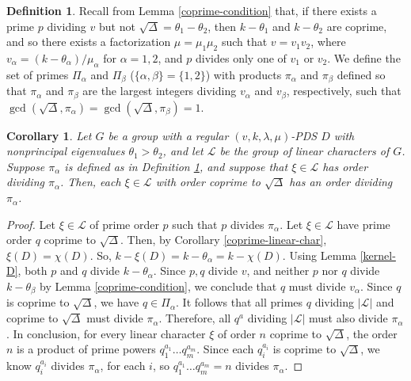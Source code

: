 \documentclass[12pt]{amsproc} %
\newtheorem{cor}[thm]{Corollary}
\theoremstyle{definition}\newtheorem{defn}[thm]{Definition}
\theoremstyle{definition}\newtheorem{rem}[thm]{Remark}
\theoremstyle{definition}\newtheorem{ex}[thm]{Example}
\begin{document}
\begin{defn}\label{def:pi}
Recall from Lemma \ref{coprime-condition} that, if there exists a prime $p$ dividing $v$ but not $\sqrt{\Delta} = \theta_1 - \theta_2$, then $k - \theta_1$ and $k - \theta_2$ are coprime, and so there exists a factorization $\mu = \mu_1 \mu_2$ such that $v = v_1v_2$, where $v_\alpha = (k - \theta_\alpha)/\mu_\alpha$ for $\alpha = 1,2$, and $p$ divides only one of $v_1$ or $v_2$.  We define the set of primes $\Pi_\alpha$ and $\Pi_\beta$ ($\{\alpha, \beta\} = \{1, 2\}$) with products $\pi_\alpha$ and $\pi_\beta$ defined so that $\pi_\alpha$ and $\pi_\beta$ are the largest integers dividing $v_\alpha$ and $v_\beta$, respectively, such that $\gcd(\sqrt\Delta, \pi_\alpha) = \gcd(\sqrt\Delta,\pi_\beta) = 1$.
\end{defn}

\begin{cor}\label{xi-divides-theta_alpha}
    Let $G$ be a group with a regular $(v, k, \lambda, \mu)$-PDS $D$ with nonprincipal eigenvalues $\theta_1 > \theta_2$, and let $\mathcal{L}$ be the group of linear characters of $G$.  Suppose $\pi_\alpha$ is defined as in Definition \ref{def:pi}, and suppose that $\xi \in \mathcal{L}$ has order dividing $\pi_\alpha$. Then, each $\xi \in \mathcal{L}$ with order coprime to $\sqrt\Delta$ has an order dividing $\pi_\alpha$.
\end{cor}
	\begin{proof}
		Let $\xi \in \mathcal{L}$ of prime order $p$ such that $p$ divides $\pi_\alpha$. Let $\xi \in \mathcal{L}$ have prime order $q$ coprime to $\sqrt\Delta$. Then, by Corollary \ref{coprime-linear-char}, $\xi(D) = \chi(D)$. So, $k - \xi(D) = k - \theta_\alpha = k - \chi(D)$. Using Lemma \ref{kernel-D}, both $p$ and $q$ divide $k - \theta_\alpha$. Since $p, q$ divide $v$, and neither $p$ nor $q$ divide $k - \theta_\beta$ by Lemma \ref{coprime-condition}, we conclude that $q$ must divide $v_\alpha$. Since $q$ is coprime to $\sqrt\Delta$, we have $q \in \Pi_\alpha$. It follows that all primes $q$ dividing $|\mathcal{L}|$ and coprime to $\sqrt\Delta$ must divide $\pi_\alpha$. Therefore, all $q^a$ dividing $|\mathcal{L}|$ must also divide $\pi_\alpha$. In conclusion, for every linear character $\xi$ of order $n$ coprime to $\sqrt\Delta$, the order $n$ is a product of prime powers $q_1^{a_1}\dots q_m^{a_m}$. Since each $q_i^{a_i}$ is coprime to $\sqrt\Delta$, we know $q_i^{a_i}$ divides $\pi_\alpha$, for each $i$, so $q_1^{a_1}\dots q_m^{a_m} = n$ divides $\pi_\alpha$.
	\end{proof}
	
\end{document}

